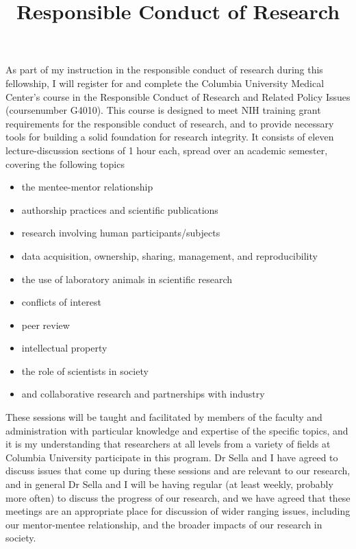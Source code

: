 \documentclass[11pt]{article}
\title{Responsible Conduct of Research}
\date{}
\begin{document}
\maketitle

As part of my instruction in the responsible conduct of research during this fellowship, I will register for and complete the Columbia University Medical Center's course in the Responsible Conduct of Research and Related Policy Issues (coursenumber G4010). This course is designed to meet NIH training grant requirements for the responsible conduct of research, and to provide necessary tools for building a solid foundation for research integrity. It consists of eleven lecture-discussion sections of 1 hour each, spread over an academic semester, covering the following topics
\begin{itemize}
  \itemsep0em 
\item the mentee-mentor relationship
\item authorship practices and scientific publications
\item research involving human participants/subjects
\item data acquisition, ownership, sharing, management, and reproducibility
\item the use of laboratory animals in scientific research
\item conflicts of interest
\item peer review
\item intellectual property
\item the role of scientists in society
\item and collaborative research and partnerships with industry
\end{itemize}

These sessions will be taught and facilitated by members of the faculty and administration with particular knowledge and expertise of the specific topics, and it is my understanding that researchers at all levels from a variety of fields at Columbia University participate in this program. Dr Sella and I have agreed to discuss issues that come up during these sessions and are relevant to our research, and in general Dr Sella and I will be having regular (at least weekly, probably more often) to discuss the progress of our research, and we have agreed that these meetings are an appropriate place for discussion of wider ranging issues, including our mentor-mentee relationship, and the broader impacts of our research in society.
\end{document}
